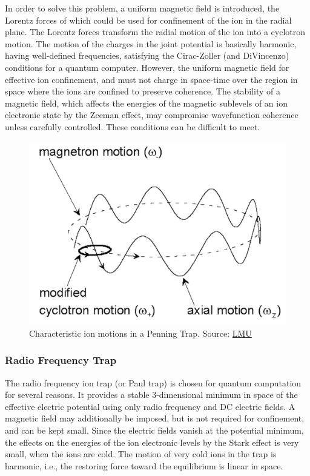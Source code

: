 \documentclass[../main.tex]{subfiles}
\begin{document}
In order to solve this problem, a uniform magnetic field is introduced, the Lorentz forces of which could be used for confinement of the ion in the radial plane. The Lorentz forces transform the radial motion of the ion into a cyclotron motion. The motion of the charges in the joint potential is basically harmonic, having well-defined frequencies, satisfying the Cirac-Zoller (and DiVincenzo) conditions for a quantum computer. However, the uniform magnetic field for effective ion confinement, and must not charge in space-time over the region in space where the ions are confined to preserve coherence. The stability of a magnetic field, which affects the energies of the magnetic sublevels of an ion electronic state by the Zeeman effect, may compromise wavefunction coherence unless carefully controlled. These conditions can be difficult to meet.

\begin{figure}[!ht]
    \centering
    \includegraphics[scale = 0.12]{images/penning trap.png}
    \caption{Characteristic ion motions in a Penning Trap. Source: \href{https://www.med.physik.uni-muenchen.de/research/nuclear-science/nuclear-masses/mlltrap/layout/traps/index.html}{LMU}}
\end{figure}

\subsubsection{Radio Frequency Trap}

The radio frequency ion trap (or Paul trap) is chosen for quantum computation for several reasons. It provides a stable 3-dimensional minimum in space of the effective electric potential using only radio frequency and DC electric fields. A magnetic field may additionally be imposed, but is not required for confinement, and can be kept small. Since the electric fields vanish at the potential minimum, the effects on the energies of the ion electronic levels by the Stark effect\cite{STARK1913} is very small, when the ions are cold. The motion of very cold ions in the trap is harmonic, i.e., the restoring force toward the equilibrium is linear in space.
\end{document}
